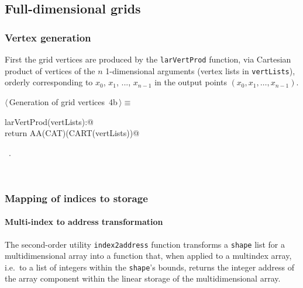 \documentclass[11pt,oneside]{article}	%
\begin{document}
\subsection{Full-dimensional grids}

\subsubsection{Vertex generation}

First the grid vertices are produced by the \texttt{larVertProd} function, via Cartesian product of vertices of the $n$ 1-dimensional arguments (vertex lists in \texttt{vertLists}), orderly corresponding to $x_0$, $x_1$, ..., $x_{n-1}$ in the output points $(x_0, x_1,\ldots,x_{n-1})$.
\begin{flushleft} \small
\begin{minipage}{\linewidth} \label{scrap5}
\protect{}$\langle\,$Generation of grid vertices\nobreak\ {\footnotesize 4b}$\,\rangle\equiv$
\vspace{-1ex}
\begin{list}{}{} \item
\mbox{}\verb@def larVertProd(vertLists):@\\
\mbox{}\verb@    return AA(CAT)(CART(vertLists))@\\
\mbox{}\verb@@{\NWsep}
\end{list}
\vspace{-1ex}
\footnotesize\addtolength{\baselineskip}{-1ex}
\begin{list}{}{\setlength{\itemsep}{-\parsep}\setlength{\itemindent}{-\leftmargin}}
\item \NWtxtMacroRefIn\ .
\end{list}
\end{minipage}\\[4ex]
\end{flushleft}


\subsubsection{Mapping of indices to storage}

\paragraph{Multi-index to address transformation}
The second-order utility \texttt{index2address} function transforms a \texttt{shape} list for a multidimensional array into a function that, when applied to a multindex array, i.e.~to a list of integers within the \texttt{shape}'s bounds, returns the integer address of the array component within the linear storage of the multidimensional array.
\end{document}
